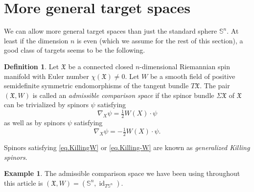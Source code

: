 \documentclass[11pt,reqno]{amsart}
\newcommand{\Sn}{\mathbb{S}^n}
\newcommand{\XX}{\mathfrak{X}}
\newcommand{\<}{\langle}
\renewcommand{\>}{\rangle}
\DeclareMathOperator{\id}{\mathrm{id}}
\theoremstyle{definition}
\newtheorem{definition}{Definition}
\newtheorem{example}{Example}
\begin{document}
\section{More general target spaces}\label{sec.X}
We can allow more general target spaces than just the standard sphere $\Sn$.
At least if the dimension $n$ is even (which we assume for the rest of this section), a good class of targets seems to be the following.

\begin{definition}
Let $\XX$ be a connected closed $n$-dimensional Riemannian spin manifold with Euler number $\chi(\XX)\ne0$.
Let $W$ be a smooth field of positive semidefinite symmetric endomorphisms of the tangent bundle $T\XX$.
The pair $(\XX,W)$ is called an \emph{admissible comparison space} if the spinor bundle $\Sigma \XX$ of $\XX$ can be trivialized by spinors $\psi$ satisfying 
\begin{equation}
\nabla_X\psi = \tfrac12 W(X)\cdot \psi
\label{eq.KillingW}
\end{equation}
as well as by spinors $\psi$ satisfying 
\begin{equation}
\nabla_X\psi = -\tfrac12 W(X)\cdot \psi .
\label{eq.Killing-W}
\end{equation}
\end{definition}

Spinors satisfying \eqref{eq.KillingW} or \eqref{eq.Killing-W} are known as \emph{generalized Killing spinors}.

\begin{example}
The admissible comparison space we have been using throughout this article is $(\XX,W)=(\Sn,\id_{T\Sn})$.
\end{example}
\end{document}
